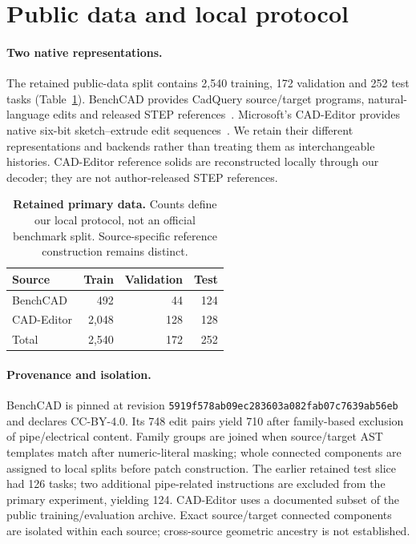 \section{Public data and local protocol}
\label{sec:data}
\paragraph{Two native representations.}
The retained public-data split contains 2,540 training, 172 validation and 252 test tasks (Table~\ref{tab:data-primary}). BenchCAD provides CadQuery source/target programs, natural-language edits and released STEP references~\cite{benchcad2026}. Microsoft's CAD-Editor provides native six-bit sketch--extrude edit sequences~\cite{cadeditor2025}. We retain their different representations and backends rather than treating them as interchangeable histories. CAD-Editor reference solids are reconstructed locally through our decoder; they are not author-released STEP references.
\begin{table}[t]
\centering\small
\begin{tabular}{lrrr}
\toprule
Source & Train & Validation & Test \\
\midrule
BenchCAD & 492 & 44 & 124 \\
CAD-Editor & 2,048 & 128 & 128 \\
\midrule
Total & 2,540 & 172 & 252 \\
\bottomrule
\end{tabular}
\caption{\textbf{Retained primary data.} Counts define our local protocol, not an official benchmark split. Source-specific reference construction remains distinct.}
\label{tab:data-primary}
\end{table}

\paragraph{Provenance and isolation.}
BenchCAD is pinned at revision \texttt{5919f578ab09ec283603a082fab07c7639ab56eb} and declares CC-BY-4.0. Its 748 edit pairs yield 710 after family-based exclusion of pipe/electrical content. Family groups are joined when source/target AST templates match after numeric-literal masking; whole connected components are assigned to local splits before patch construction. The earlier retained test slice had 126 tasks; two additional pipe-related instructions are excluded from the primary experiment, yielding 124. CAD-Editor uses a documented subset of the public training/evaluation archive. Exact source/target connected components are isolated within each source; cross-source geometric ancestry is not established.

